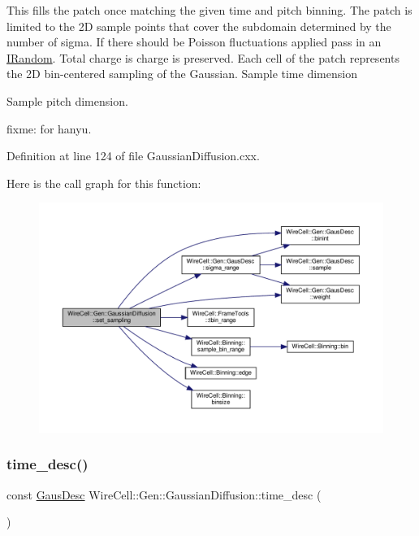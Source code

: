This fills the patch once matching the given time and pitch binning. The patch is limited to the 2D sample points that cover the subdomain determined by the number of sigma. If there should be Poisson fluctuations applied pass in an \hyperlink{class_wire_cell_1_1_i_random}{I\+Random}. Total charge is charge is preserved. Each cell of the patch represents the 2D bin-\/centered sampling of the Gaussian. Sample time dimension

Sample pitch dimension.

fixme\+: for hanyu. 

Definition at line 124 of file Gaussian\+Diffusion.\+cxx.

Here is the call graph for this function\+:
\nopagebreak
\begin{figure}[H]
\begin{center}
\leavevmode
\includegraphics[width=350pt]{class_wire_cell_1_1_gen_1_1_gaussian_diffusion_aee13d3eff7f4d5b15d2bffd7b982fae4_cgraph}
\end{center}
\end{figure}
\mbox{\label{class_wire_cell_1_1_gen_1_1_gaussian_diffusion_a7c3c7dbfeb34c5cb778c873343772427}} 
\subsubsection{\texorpdfstring{time\+\_\+desc()}{time\_desc()}}
{\footnotesize\ttfamily const \hyperlink{struct_wire_cell_1_1_gen_1_1_gaus_desc}{Gaus\+Desc} Wire\+Cell\+::\+Gen\+::\+Gaussian\+Diffusion\+::time\+\_\+desc (\begin{DoxyParamCaption}{ }\end{DoxyParamCaption})\hspace{0.3cm}{\ttfamily [inline]}}



